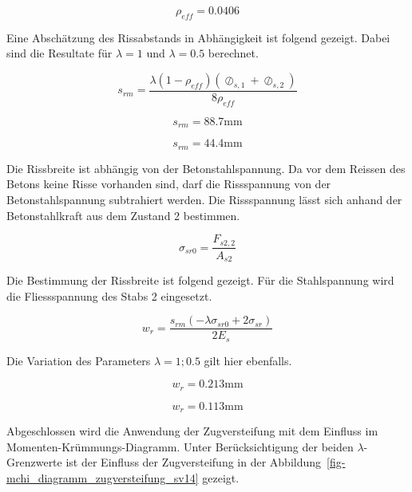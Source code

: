 \documentclass[
  12pt,
  letterpaper,
  egregdoesnotlikesansseriftitles]{scrreprt}
\begin{document}
\begin{equation}\rho_{eff} = 0.0406\end{equation}

Eine Abschätzung des Rissabstands in Abhängigkeit ist folgend gezeigt.
Dabei sind die Resultate für \(\lambda = 1\) und \(\lambda = 0.5\)
berechnet.

\begin{equation}s_{rm} = \frac{\lambda \left(1 - \rho_{eff}\right) \left(\oslash_{s,1} + \oslash_{s,2}\right)}{8 \rho_{eff}}\end{equation}

\begin{equation}s_{rm} = 88.7 \text{mm}\end{equation}

\begin{equation}s_{rm} = 44.4 \text{mm}\end{equation}

Die Rissbreite ist abhängig von der Betonstahlspannung. Da vor dem
Reissen des Betons keine Risse vorhanden sind, darf die Rissspannung von
der Betonstahlspannung subtrahiert werden. Die Rissspannung lässt sich
anhand der Betonstahlkraft aus dem Zustand 2 bestimmen.

\begin{equation}\sigma_{sr0} = \frac{F_{s2,2}}{A_{s 2}}\end{equation}

Die Bestimmung der Rissbreite ist folgend gezeigt. Für die Stahlspannung
wird die Fliessspannung des Stabs 2 eingesetzt.

\begin{equation}w_{r} = \frac{s_{rm} \left(- \lambda \sigma_{sr0} + 2 \sigma_{sr}\right)}{2 E_{s}}\end{equation}

Die Variation des Parameters \(\lambda = 1 ; 0.5\) gilt hier ebenfalls.

\begin{equation}w_{r} = 0.213 \text{mm}\end{equation}

\begin{equation}w_{r} = 0.113 \text{mm}\end{equation}

Abgeschlossen wird die Anwendung der Zugversteifung mit dem Einfluss im
Momenten-Krümmungs-Diagramm. Unter Berücksichtigung der beiden
\(\lambda\)-Grenzwerte ist der Einfluss der Zugversteifung in der
Abbildung~\ref{fig-mchi_diagramm_zugversteifung_sv14} gezeigt.
\end{document}
